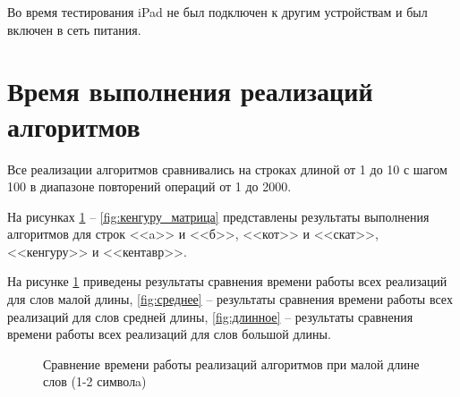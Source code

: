 Во время тестирования iPad не был подключен к другим устройствам и был включен в сеть питания.

\section{Время выполнения реализаций алгоритмов}

Все реализации алгоритмов сравнивались на строках длиной от 1 до 10 с шагом 100 в диапазоне повторений операций от 1 до 2000. 
 
На рисунках \ref{fig:короткое} --  \ref{fig:кенгуру_матрица} представлены результаты выполнения алгоритмов для строк <<a>> и <<б>>, <<кот>> и <<скат>>, <<кенгуру>> и <<кентавр>>.  
 
На рисунке \ref{fig:короткое} приведены результаты сравнения времени работы всех реализаций для слов малой длины, \ref{fig:среднее} -- результаты сравнения времени работы всех реализаций для слов средней длины, \ref{fig:длинное} -- результаты сравнения времени работы всех реализаций для слов большой длины. 

\begin{figure}[h!]
	\caption{Сравнение времени работы реализаций алгоритмов при малой длине слов (1-2 символa)}
	\label{fig:короткое}
\end{figure}

